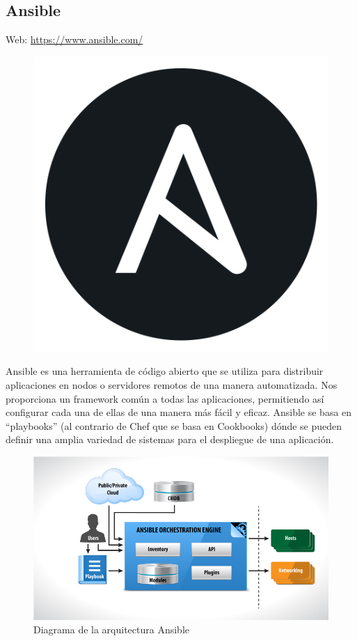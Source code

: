 \subsection{Ansible}
Web: \url{https://www.ansible.com/}\\
\begin{figure}[H]
  \begin{center}
    \includegraphics[scale=0.1]{diagramas/ansible-logo.png}
  \end{center}
\end{figure}

Ansible es una herramienta de código abierto que se utiliza para distribuir aplicaciones en nodos o servidores remotos de una manera automatizada. Nos proporciona un framework común a todas las aplicaciones, permitiendo así configurar cada una de ellas de una manera más fácil y eficaz. Ansible se basa en ``playbooks'' (al contrario de Chef que se basa en Cookbooks) dónde se pueden definir una amplia variedad de sistemas para el despliegue de una aplicación.

\begin{figure}[H]
  \begin{center}
  \includegraphics[scale=.5]{diagramas/ansible.jpg}
  \caption{Diagrama de la arquitectura Ansible}
  \end{center}
\end{figure}

